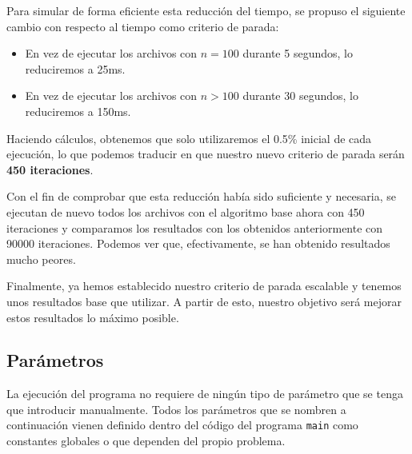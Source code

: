 Para simular de forma eficiente esta reducción del tiempo, se propuso el siguiente cambio con respecto al tiempo como criterio de parada:
\begin{itemize}
	\item En vez de ejecutar los archivos con $n=100$ durante 5 segundos, lo reduciremos a 25ms.
	\item En vez de ejecutar los archivos con $n>100$ durante 30 segundos, lo reduciremos a 150ms.
\end{itemize}
Haciendo cálculos, obtenemos que solo utilizaremos el 0.5\% inicial de cada ejecución, lo que podemos traducir en que nuestro nuevo criterio de parada serán \textbf{450 iteraciones}. 

Con el fin de comprobar que esta reducción había sido suficiente y necesaria, se ejecutan de nuevo todos los archivos con el algoritmo base ahora con 450 iteraciones y comparamos los resultados con los obtenidos anteriormente con 90000 iteraciones. 
Podemos ver que, efectivamente, se han obtenido resultados mucho peores. 

Finalmente, ya hemos establecido nuestro criterio de parada escalable y tenemos unos resultados base que utilizar. 
A partir de esto, nuestro objetivo será mejorar estos resultados lo máximo posible.

\subsection{Parámetros}

La ejecución del programa no requiere de ningún tipo de parámetro que se tenga que introducir manualmente. 
Todos los parámetros que se nombren a continuación vienen definido dentro del código del programa \texttt{main} como constantes globales o que dependen del propio problema. 

